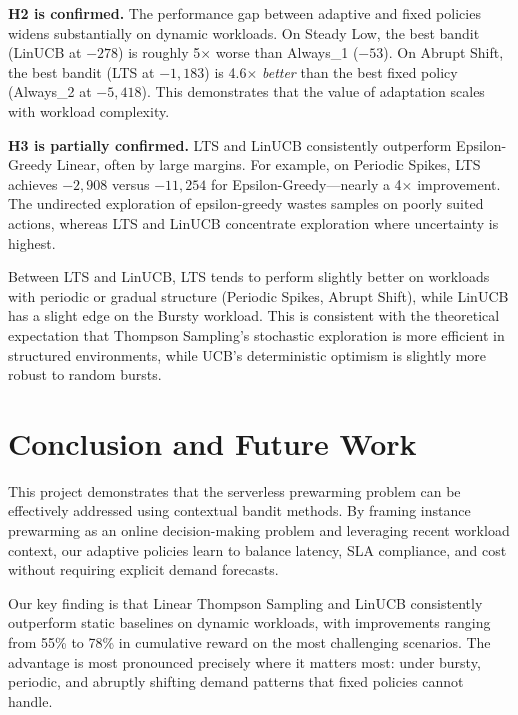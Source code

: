 \documentclass[11pt]{article}
\begin{document}
\textbf{H2 is confirmed.} The performance gap between adaptive and fixed policies widens substantially on dynamic workloads. On Steady Low, the best bandit (LinUCB at $-278$) is roughly 5$\times$ worse than Always\_1 ($-53$). On Abrupt Shift, the best bandit (LTS at $-1{,}183$) is 4.6$\times$ \emph{better} than the best fixed policy (Always\_2 at $-5{,}418$). This demonstrates that the value of adaptation scales with workload complexity.

\textbf{H3 is partially confirmed.} LTS and LinUCB consistently outperform Epsilon-Greedy Linear, often by large margins. For example, on Periodic Spikes, LTS achieves $-2{,}908$ versus $-11{,}254$ for Epsilon-Greedy---nearly a 4$\times$ improvement. The undirected exploration of epsilon-greedy wastes samples on poorly suited actions, whereas LTS and LinUCB concentrate exploration where uncertainty is highest.

Between LTS and LinUCB, LTS tends to perform slightly better on workloads with periodic or gradual structure (Periodic Spikes, Abrupt Shift), while LinUCB has a slight edge on the Bursty workload. This is consistent with the theoretical expectation that Thompson Sampling's stochastic exploration is more efficient in structured environments, while UCB's deterministic optimism is slightly more robust to random bursts.

\section{Conclusion and Future Work}

This project demonstrates that the serverless prewarming problem can be effectively addressed using contextual bandit methods. By framing instance prewarming as an online decision-making problem and leveraging recent workload context, our adaptive policies learn to balance latency, SLA compliance, and cost without requiring explicit demand forecasts.

Our key finding is that Linear Thompson Sampling and LinUCB consistently outperform static baselines on dynamic workloads, with improvements ranging from 55\% to 78\% in cumulative reward on the most challenging scenarios. The advantage is most pronounced precisely where it matters most: under bursty, periodic, and abruptly shifting demand patterns that fixed policies cannot handle.
\end{document}
